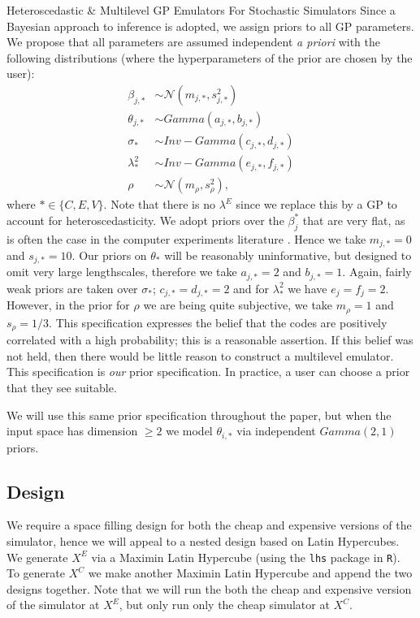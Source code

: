 \begin{chapter}{Heteroscedastic \& Multilevel GP Emulators For Stochastic Simulators\label{Ch:Hetsml}}
Since a Bayesian approach to inference is adopted, we assign priors to all GP parameters. We propose that all parameters are assumed independent \textit{a priori} with the following distributions (where the hyperparameters of the prior are chosen by the user):
\begin{align}
\beta_{j, *} &\sim \mathcal{N}(m_{j,*}, s_{j,*}^2)\nonumber \\
\theta_{j,*} &\sim  Gamma(a_{j, *}, b_{j, *}) \nonumber\\
\sigma_* &\sim Inv-Gamma(c_{j,*}, d_{j,*}) \nonumber\\
\lambda_*^2 &\sim Inv-Gamma(e_{j,*}, f_{j,*})\nonumber \\
\rho &\sim \mathcal{N}(m_{\rho}, s_{\rho}^2),\nonumber
\end{align}
\noindent where $* \in \{C, E, V \}$. Note that there is no $\lambda^E$ since we replace this by a GP to account for heteroscedasticity. We adopt priors over the $\beta^{*}_j$ that are very flat, as is often the case in the computer experiments literature \citep{Oakley2017}. Hence we take $m_{j,*} = 0$ and $s_{j,*}=10$. Our priors on $\theta_{*}$ will be reasonably uninformative, but designed to omit very large lengthscales, therefore we take $a_{j,*} = 2$ and $b_{j,*} = 1$. Again, fairly weak priors are taken over $\sigma_*$; $c_{j,*}=d_{j,*}=2$ and for $\lambda^2_*$ we have $e_j = f_j=2$. However, in the prior for $\rho$ we are being quite subjective, we take $m_\rho = 1$ and $s_\rho = 1/3$. This specification expresses the belief that the codes are positively correlated with a high probability; this is a reasonable assertion. If this belief was not held, then there would be little reason to construct a multilevel emulator. This specification is \textit{our} prior specification. In practice, a user can choose a prior that they see suitable.

We will use this same prior specification throughout the paper, but when the input space has dimension $\geq 2$ we model $\theta_{i, *}$ via independent $Gamma(2,1)$ priors.

\subsection{Design \label{Sec:design}}

We require a space filling design for both the cheap and expensive versions of the simulator, hence we will appeal to a nested design based on Latin Hypercubes. We generate $X^E$ via a Maximin Latin Hypercube \citep{Mckay1979} (using the \verb|lhs| package in \verb|R|). To generate $X^C$ we make another Maximin Latin Hypercube and append the two designs together. Note that we will run the both the cheap and expensive version of the simulator at $X^E$, but only run only the cheap simulator at $X^C$.


\end{chapter}
